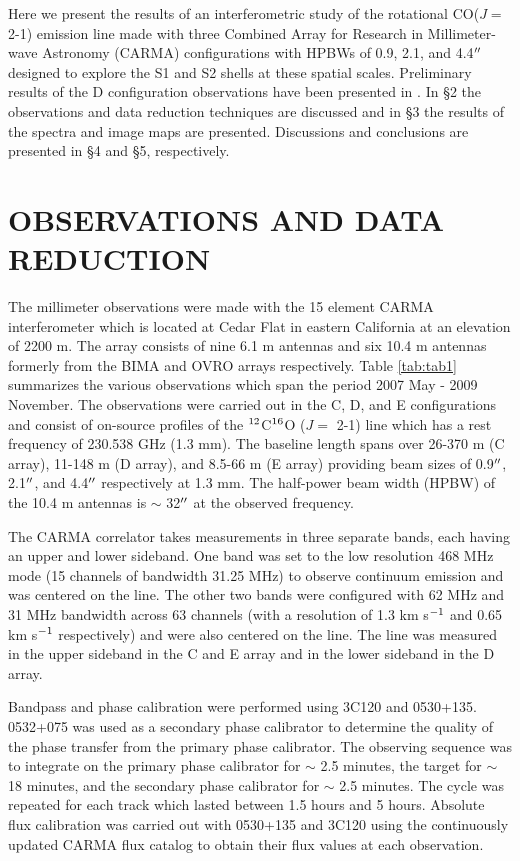 \documentclass[preprint2]{aastex}
\begin{document}
Here we present the results of an interferometric study of the rotational CO($J=$ 2-1) emission line made with three Combined Array for Research in Millimeter-wave Astronomy (CARMA) configurations with HPBWs of 0.9, 2.1, and 4.4$\mbox{$^{\prime\prime}$}$ designed to explore the S1 and S2 shells at these spatial scales.  Preliminary results of the D configuration observations have been presented in \cite{2009AIPC.1094..868H}. In \S2 the observations and data reduction techniques are discussed and in \S3 the results of the spectra and image maps are presented. Discussions and conclusions are presented in \S4 and \S5, respectively.

\section{OBSERVATIONS AND DATA REDUCTION}

The millimeter observations were made with the 15 element CARMA interferometer \citep{2004ASPC..314..768S} which is located at Cedar Flat in eastern California at an elevation of 2200 m. The array consists of nine 6.1 m antennas and six 10.4 m antennas formerly from the BIMA and OVRO arrays respectively. Table \ref{tab:tab1} summarizes the various observations which span the period 2007 May - 2009 November. The observations were carried out in the C, D, and E configurations and consist of on-source profiles of the $\rm{{}^{12}}$C$\rm{{}^{16}}$O ($J=$ 2-1) line which has a rest frequency of 230.538 GHz (1.3 mm). The baseline length spans over 26-370 m (C array), 11-148 m (D array), and 8.5-66 m (E array) providing beam sizes of 0.9$\mbox{$^{\prime\prime}$}$, 2.1$\mbox{$^{\prime\prime}$}$, and 4.4$\mbox{$^{\prime\prime}$}$ respectively at 1.3 mm. The half-power beam width (HPBW) of the 10.4 m antennas is $\sim$ 32$\mbox{$^{\prime\prime}$}$ at the observed frequency.

The CARMA correlator takes measurements in three separate bands, each having an upper and lower sideband. One band was set to the low resolution 468 MHz mode (15 channels of bandwidth 31.25 MHz) to observe continuum emission and was centered on the line. The other two bands were configured with 62 MHz and 31 MHz bandwidth across 63 channels (with a resolution of 1.3 km s$\rm{{}^{-1}}$ and 0.65 km s$\rm{{}^{-1}}$ respectively) and were also centered on the line. The line was measured in the upper sideband in the C and E array and in the lower sideband in the D array.

Bandpass and phase calibration were performed using 3C120 and 0530+135. 0532+075 was used as a secondary phase calibrator to determine the quality of the phase transfer from the primary phase calibrator. The observing sequence was to integrate on the primary phase calibrator for $\sim$ 2.5 minutes, the target for $\sim$ 18 minutes, and the secondary phase calibrator for $\sim$ 2.5 minutes. The cycle was repeated for each track which lasted between 1.5 hours and 5 hours. Absolute flux calibration was carried out with 0530+135 and 3C120 using the continuously updated CARMA flux catalog to obtain their flux values at each observation.
\end{document}
